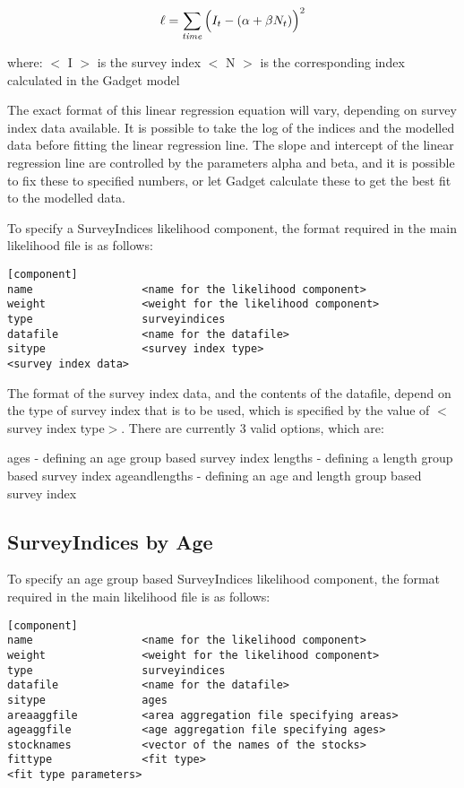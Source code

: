 \documentclass [a4paper, 10pt]{book}
\begin{document}
\begin{equation}\label{eq:surveyindex}
\ell = \sum_{\it time}\Big(I_{t} - (\alpha + \beta N_{t})\Big)^2
\end{equation}

where:\newline
$<$ I $>$ is the survey index\newline
$<$ N $>$ is the corresponding index calculated in the Gadget model

\bigskip
The exact format of this linear regression equation will vary, depending on survey index data available.  It is possible to take the log of the indices and the modelled data before fitting the linear regression line.  The slope and intercept of the linear regression line are controlled by the parameters alpha and beta, and it is possible to fix these to specified numbers, or let Gadget calculate these to get the best fit to the modelled data.

\bigskip
To specify a SurveyIndices likelihood component, the format required in the main likelihood file is as follows:

{\small\begin{verbatim}
[component]
name                 <name for the likelihood component>
weight               <weight for the likelihood component>
type                 surveyindices
datafile             <name for the datafile>
sitype               <survey index type>
<survey index data>
\end{verbatim}}

The format of the survey index data, and the contents of the datafile, depend on the type of survey index that is to be used, which is specified by the value of $<$survey index type$>$.  There are currently 3 valid options, which are:

\bigskip
ages - defining an age group based survey index\newline
lengths - defining a length group based survey index\newline
ageandlengths - defining an age and length group based survey index

\subsection{SurveyIndices by Age}\label{subsec:sibyage}
To specify an age group based SurveyIndices likelihood component, the format required in the main likelihood file is as follows:

{\small\begin{verbatim}
[component]
name                 <name for the likelihood component>
weight               <weight for the likelihood component>
type                 surveyindices
datafile             <name for the datafile>
sitype               ages
areaaggfile          <area aggregation file specifying areas>
ageaggfile           <age aggregation file specifying ages>
stocknames           <vector of the names of the stocks>
fittype              <fit type>
<fit type parameters>
\end{verbatim}}
\end{document}
